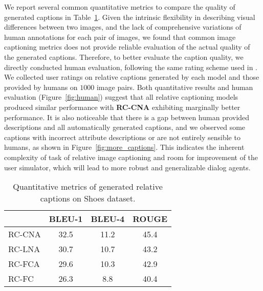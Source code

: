 We report several common quantitative metrics to compare the quality of generated
captions in Table~\ref{tab:scores}. Given the intrinsic flexibility in describing visual differences between two images, and the lack of comprehensive variations 
of human annotations for each pair of images, we found that common image captioning 
metrics does not provide reliable evaluation of the 
actual quality of the generated captions.
Therefore, to better evaluate the caption quality, 
we directly conducted human evaluation, following the same rating scheme used in
\cite{vinyals2015show}. We collected user ratings on relative captions generated by
each model and those provided by humans on $1000$ image pairs. 
Both quantitative results and human evaluation (Figure~\ref{fig:human}) suggest that
all relative captioning models produced similar performance with \textbf{RC-CNA} 
exhibiting marginally better performance. It is also noticeable that there is a gap 
between human provided descriptions and all automatically generated captions,
and we observed some captions with incorrect attribute descriptions or are not
entirely sensible to humans, as shown in Figure~\ref{fig:more_captions}.
This indicates the inherent complexity of task of relative image
captioning and room for improvement of the user simulator,
which will lead to more robust and generalizable dialog agents. 

\begin{table}
  \centering
   \caption{Quantitative metrics of generated relative captions on Shoes dataset.} 
  \begin{tabular}{l|c|c|c}
  \hline
  & BLEU-1 & BLEU-4 & ROUGE  \\
  \hline
  RC-CNA & 32.5 & 11.2 & 45.4 \\
  RC-LNA & 30.7 & 10.7 & 43.2 \\
  RC-FCA & 29.6 & 10.3 & 42.9 \\
  RC-FC & 26.3 & 8.8 & 40.4 \\
  \hline
  \end{tabular}
 \label{tab:scores}
\end{table}


